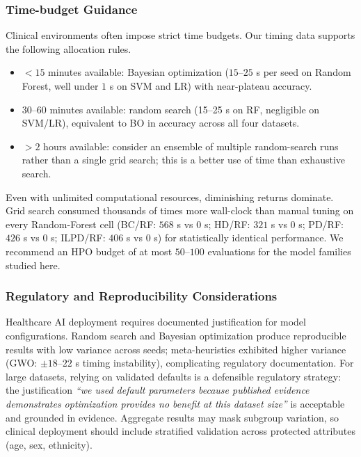 \documentclass[letterpaper, 10 pt, conference]{ieeeconf}
\begin{document}
\subsubsection{Time-budget Guidance}

Clinical environments often impose strict time budgets. Our timing data supports the following allocation rules.
\begin{itemize}
	\item $<15$ minutes available: Bayesian optimization ($15$--$25$ s per seed on Random Forest, well under $1$ s on SVM and LR) with near-plateau accuracy.
	\item $30$--$60$ minutes available: random search (15--25 s on RF, negligible on SVM/LR), equivalent to BO in accuracy across all four datasets.
	\item $>2$ hours available: consider an ensemble of multiple random-search runs rather than a single grid search; this is a better use of time than exhaustive search.
\end{itemize}
Even with unlimited computational resources, diminishing returns dominate. Grid search consumed thousands of times more wall-clock than manual tuning on every Random-Forest cell (BC/RF: $568$ s vs $0$ s; HD/RF: $321$ s vs $0$ s; PD/RF: $426$ s vs $0$ s; ILPD/RF: $406$ s vs $0$ s) for statistically identical performance. We recommend an HPO budget of at most $50$--$100$ evaluations for the model families studied here.

\subsubsection{Regulatory and Reproducibility Considerations}

Healthcare AI deployment requires documented justification for model configurations. Random search and Bayesian optimization produce reproducible results with low variance across seeds; meta-heuristics exhibited higher variance (GWO: $\pm18$--$22$ s timing instability), complicating regulatory documentation. For large datasets, relying on validated defaults is a defensible regulatory strategy: the justification \emph{``we used default parameters because published evidence demonstrates optimization provides no benefit at this dataset size''} is acceptable and grounded in evidence. Aggregate results may mask subgroup variation, so clinical deployment should include stratified validation across protected attributes (age, sex, ethnicity).

\end{document}
